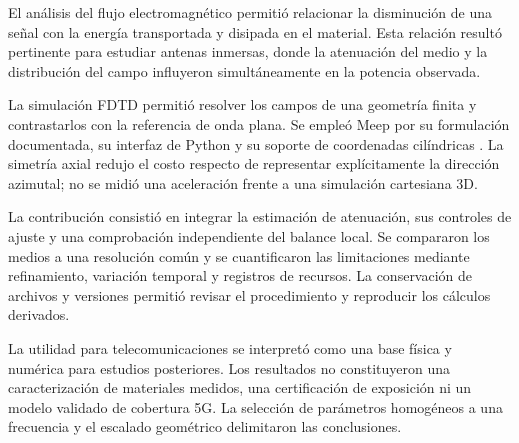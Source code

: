 El análisis del flujo electromagnético permitió relacionar la disminución de una señal con la energía transportada y disipada en el material. Esta relación resultó pertinente para estudiar antenas inmersas, donde la atenuación del medio y la distribución del campo influyeron simultáneamente en la potencia observada.

La simulación FDTD permitió resolver los campos de una geometría finita y contrastarlos con la referencia de onda plana. Se empleó Meep por su formulación documentada, su interfaz de Python y su soporte de coordenadas cilíndricas \citep{Yee1966,Oskooi2010}. La simetría axial redujo el costo respecto de representar explícitamente la dirección azimutal; no se midió una aceleración frente a una simulación cartesiana 3D.

La contribución consistió en integrar la estimación de atenuación, sus controles de ajuste y una comprobación independiente del balance local. Se compararon los medios a una resolución común y se cuantificaron las limitaciones mediante refinamiento, variación temporal y registros de recursos. La conservación de archivos y versiones permitió revisar el procedimiento y reproducir los cálculos derivados.

La utilidad para telecomunicaciones se interpretó como una base física y numérica para estudios posteriores. Los resultados no constituyeron una caracterización de materiales medidos, una certificación de exposición ni un modelo validado de cobertura 5G. La selección de parámetros homogéneos a una frecuencia y el escalado geométrico delimitaron las conclusiones.
